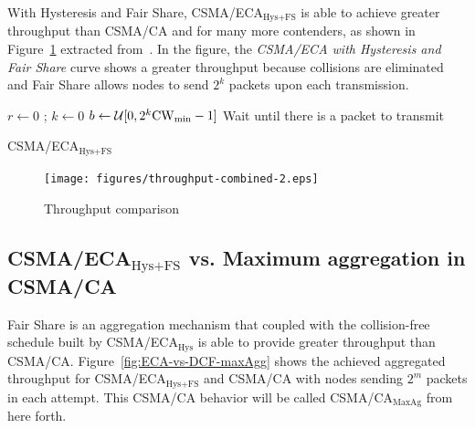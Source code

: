 \documentclass[a4paper,journal]{IEEEtran}
\begin{document}
	With Hysteresis and Fair Share, CSMA/ECA$_{\text{Hys+FS}}$ is able to achieve greater throughput than CSMA/CA and for many more contenders, as shown in Figure~\ref{fig:ECA+H+F-throughput} extracted from~\cite{research2standards}. In the figure, the \emph{CSMA/ECA with Hysteresis and Fair Share} curve shows a greater throughput because collisions are eliminated and Fair Share allows nodes to send $2^{k}$ packets upon each transmission.

	\begin{algorithm}[tb]
	{
	  $r \leftarrow 0$ ; $k \leftarrow 0$\;
	  $b \leftarrow \mathcal{U}[0,2^k\rm{CW}_{min}-1]$\;
	  Wait until there is a packet to transmit\;
	}
	\vspace{0.2cm}
	\caption{CSMA/ECA$_{\text{Hys+FS}}$}
	\label{alg:fullECA}
	\end{algorithm}

	\begin{figure}[tb]
	\centering
		\texttt{[image: figures/throughput-combined-2.eps]}
		\caption{Throughput comparison~\cite{research2standards}}
		\label{fig:ECA+H+F-throughput}
	\end{figure}


	\subsection{CSMA/ECA$_{\text{Hys+FS}}$ vs. Maximum aggregation in CSMA/CA}
	Fair Share is an aggregation mechanism that coupled with the collision-free schedule built by CSMA/ECA$_{\text{Hys}}$ is able to provide greater throughput than CSMA/CA. Figure~\ref{fig:ECA-vs-DCF-maxAgg} shows the achieved aggregated throughput for CSMA/ECA$_{\text{Hys+FS}}$ and CSMA/CA with nodes sending $2^m$ packets in each attempt. This CSMA/CA behavior will be called CSMA/CA$_{\text{MaxAg}}$ from here forth.
	
\end{document}
